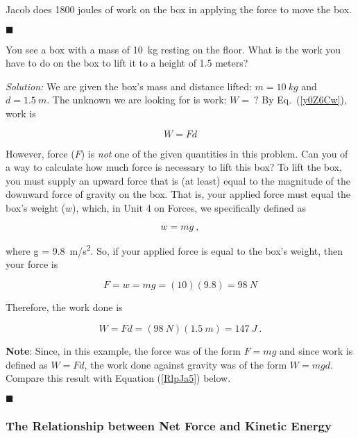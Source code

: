\documentclass[dvipsnames]{article}
\begin{document}
Jacob does 1800 joules of work on the box in applying the force to move the box.

\hfill $\blacksquare$


\begin{example}\label{O9RxyJ}
You see a box with a mass of \SI{10}{kg} resting on the floor. What is the work you have to do on the box to lift it to a height of 1.5 meters? 
\end{example} 
 

\textit{Solution:} 
We are given the box's mass and distance lifted: $m = \SI{10}{kg}$ and $d = \SI{1.5}{m}$. The unknown we are looking for is work: $W =\ ?$ By Eq.~(\ref{y0Z6Cw}), work is

\begin{equation*}
    W = F d
\end{equation*}

However, force ($F$) is \textit{not} one of the given quantities in this problem. Can you of a way to calculate how much force is necessary to lift this box? To lift the box, you must supply an upward force that is (at least) equal to the magnitude of the downward force of gravity on the box. That is, your applied force must equal the box's weight ($w$), which, in Unit 4 on Forces, we specifically defined as

\begin{equation*}
    w = m g\ ,
\end{equation*}

where  g = \SI{9.8}{m/s^2}. So, if your applied force is equal to the box's weight, then your force is

\begin{equation*}
    F = w = mg = (10)(9.8) = \SI{98}{N}
\end{equation*}

Therefore, the work done is

\begin{equation*}
    W = F d = (\SI{98}{N})(\SI{1.5}{m}) = \SI{147}{J} \ .
\end{equation*}

\textbf{Note}: Since, in this example, the force was of the form $F = mg$ and since work is defined as $W = F d$, the work done against gravity was of the form $W = mgd$. Compare this result with Equation (\ref{RlpJa5}) below.

\hfill $\blacksquare$

\subsubsection{The Relationship between Net Force and Kinetic Energy}
\end{document}
